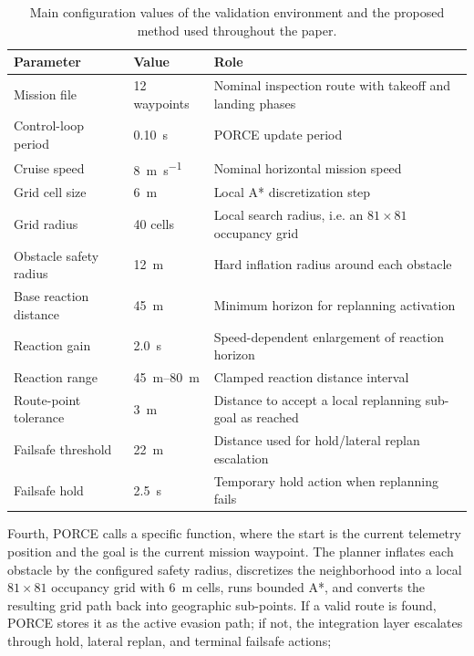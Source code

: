 \documentclass[journal,twoside,web]{ieeecolor}
\begin{document}
\begin{table}[h!]
    \centering
    \small
    \begin{tabular}{@{}p{} p{} p{}@{}}
        \toprule
        \textbf{Parameter} & \textbf{Value} & \textbf{Role} \\
        \midrule
        Mission file & 12 waypoints & Nominal inspection route with takeoff and landing phases \\
        Control-loop period & \SI{0.10}{\second} & PORCE update period \\
        Cruise speed & \SI{8}{\meter\per\second} & Nominal horizontal mission speed \\
        Grid cell size & \SI{6}{\meter} & Local A* discretization step \\
        Grid radius & 40 cells & Local search radius, i.e. an \(81 \times 81\) occupancy grid \\
        Obstacle safety radius & \SI{12}{\meter} & Hard inflation radius around each obstacle \\
        Base reaction distance & \SI{45}{\meter} & Minimum horizon for replanning activation \\
        Reaction gain & \SI{2.0}{\second} & Speed-dependent enlargement of reaction horizon \\
        Reaction range & \SIrange{45}{80}{\meter} & Clamped reaction distance interval \\
        Route-point tolerance & \SI{3}{\meter} & Distance to accept a local replanning sub-goal as reached \\
        Failsafe threshold & \SI{22}{\meter} & Distance used for hold/lateral replan escalation \\
        Failsafe hold & \SI{2.5}{\second} & Temporary hold action when replanning fails \\
        \bottomrule
    \end{tabular}
    \caption{Main configuration values of the validation environment and the proposed method used throughout the paper.}
    \label{tab:config}
\end{table}

Fourth, PORCE calls a specific function, where the start is the current telemetry position and the goal is the current mission waypoint. The planner inflates each obstacle by the configured safety radius, discretizes the neighborhood into a local \(81 \times 81\) occupancy grid with \SI{6}{\meter} cells, runs bounded A*, and converts the resulting grid path back into geographic sub-points. If a valid route is found, PORCE stores it as the active evasion path; if not, the integration layer escalates through hold, lateral replan, and terminal failsafe actions;
\newline
\end{document}
